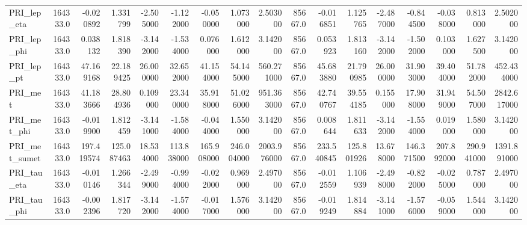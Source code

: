\begin{tabular}{lrrrrrrrrrrrrrrrr}
PRI\_lep\_eta                 &  164333.0 &      -0.020892 &      1.331799 &      -2.505000 &      -1.122000 &      -0.050000 &       1.073000 &       2.503000 &  85667.0 &      -0.016851 &      1.125765 &      -2.487000 &      -0.844500 &      -0.038000 &       0.813000 &       2.502000 \\
PRI\_lep\_phi                 &  164333.0 &       0.038132 &      1.818390 &      -3.142000 &      -1.534000 &       0.076000 &       1.612000 &       3.142000 &  85667.0 &       0.053923 &      1.813160 &      -3.142000 &      -1.502000 &       0.103000 &       1.627500 &       3.142000 \\
PRI\_lep\_pt                  &  164333.0 &      47.169168 &     22.189425 &      26.000000 &      32.652000 &      41.154000 &      54.145000 &     560.271000 &  85667.0 &      45.683880 &     21.790985 &      26.000000 &      31.903000 &      39.404000 &      51.782000 &     452.434000 \\
PRI\_met                     &  164333.0 &      41.183666 &     28.804936 &       0.109000 &      23.340000 &      35.918000 &      51.026000 &     951.363000 &  85667.0 &      42.740767 &     39.554185 &       0.155000 &      17.908000 &      31.949000 &      54.507000 &    2842.617000 \\
PRI\_met\_phi                 &  164333.0 &      -0.019900 &      1.812459 &      -3.141000 &      -1.584000 &      -0.044000 &       1.550000 &       3.142000 &  85667.0 &       0.008644 &      1.811633 &      -3.142000 &      -1.554000 &       0.019000 &       1.580000 &       3.142000 \\
PRI\_met\_sumet               &  164333.0 &     197.419574 &    125.087463 &      18.534000 &     113.838000 &     165.908000 &     246.004000 &    2003.976000 &  85667.0 &     233.540845 &    125.801926 &      13.678000 &     146.371500 &     207.892000 &     290.941000 &    1391.891000 \\
PRI\_tau\_eta                 &  164333.0 &      -0.010146 &      1.266344 &      -2.499000 &      -0.994000 &      -0.022000 &       0.969000 &       2.497000 &  85667.0 &      -0.012559 &      1.106939 &      -2.498000 &      -0.822000 &      -0.025000 &       0.787000 &       2.497000 \\
PRI\_tau\_phi                 &  164333.0 &      -0.002396 &      1.817720 &      -3.142000 &      -1.574000 &      -0.017000 &       1.576000 &       3.142000 &  85667.0 &      -0.019249 &      1.814884 &      -3.141000 &      -1.576000 &      -0.059000 &       1.544000 &       3.142000 \\

\end{tabular}
